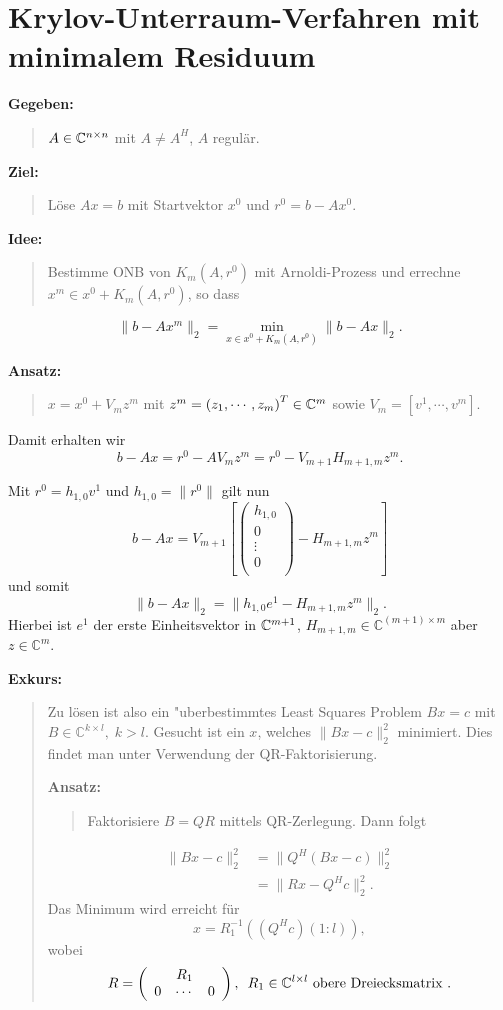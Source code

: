\section[KUV mit minimalem Residuum]{Krylov-Unterraum-Verfahren mit minimalem Residuum} \label{kap:gmres}

{\bf Gegeben: }
\begin{quote}
$A \in \mathbb{C}^{n\times n}$ mit $A \neq A^H$,  $A$ regul\"ar.
\end{quote}
{\bf Ziel: }
\begin{quote}
L\"ose $Ax = b$ mit Startvektor $x^0$ und $r^0 = b-Ax^0$.
\end{quote}
{\bf Idee:}
\begin{quote}
Bestimme ONB von $K_m(A,r^0)$ mit Arnoldi-Prozess und errechne $x^m \in x^0 + K_m(A,r^0)$, so dass
\end{quote}
\[
\|b-Ax^m\|_2 = \underset{x \in x^0 + K_m(A,r^0)}{\min} \|b-Ax\|_2.
\]

{\bf Ansatz:}
\begin{quote}
$x = x^0 + V_m z^m$ mit $z^m = \left(z_1,\cdots,z_m\right)^T \in \mathbb{C}^m$ sowie
$V_m = \left[ v^1,\cdots,v^m \right]$.
\end{quote}

Damit erhalten wir
\[
b - Ax = r^0 - AV_m z^m = r^0 - V_{m+1}H_{m+1,m}z^m.
\]

Mit $r^0 = h_{1,0} v^1$ und $h_{1,0} = \|r^0\|$ gilt nun
\[
b-Ax = V_{m+1} \left[
\left(%
\begin{array}{c}
  h_{1,0} \\
  0 \\
  \vdots \\
  0 \\
\end{array}%
\right) - H_{m+1,m} z^m \right]
\]
und somit
\[
\|b-Ax\|_2 = \|h_{1,0}e^1 - H_{m+1,m}z^m\|_2.
\]
Hierbei ist $e^1$ der erste Einheitsvektor in $\mathbb{C}^{m+1}$,
$H_{m+1,m} \in \mathbb{C}^{(m+1)\times m}$
aber $z \in \mathbb{C}^m$.

\clearpage

{\bf Exkurs:}

\begin{quote}
Zu l\"osen ist also ein "uberbestimmtes Least Squares Problem $Bx = c$ mit
$B\in \mathbb{C}^{k \times l}, \; k > l$. Gesucht ist
ein $x$, welches $\| Bx-c \|_2^2$ minimiert. Dies findet man unter Verwendung der
QR-Faktorisierung.

{\bf Ansatz:}
\begin{quote}
Faktorisiere $ B = QR$ mittels QR-Zerlegung. Dann folgt
\end{quote}
\begin{align*}
\|Bx-c\|_2^2 &= \|Q^H(Bx-c)\|_2^2\\
&= \|Rx - Q^Hc\|_2^2.
\end{align*}
Das Minimum wird erreicht f\"ur
\[
x = R_1^{-1}( (Q^Hc)(1:l) ),
\]
wobei
\[
R = \left(\begin{array}{ccc} & R_1 & \\
    0 & \cdots & 0 \end{array}
    \right), \enspace R_1 \in \mathbb{C}^{l\times l} \mbox{ obere Dreiecksmatrix }.
\]
\end{quote}

